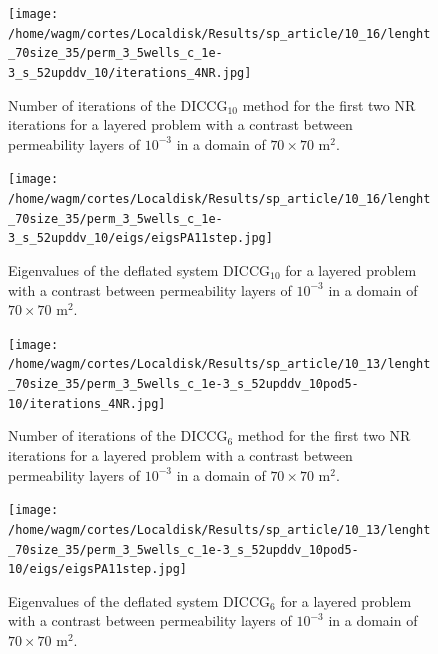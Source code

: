 \documentclass[12pt]{article}
\begin{document}
\begin{figure}[!h]
\centering
\begin{minipage}{.4\textwidth}
\vspace{-0.4cm}
\hspace{-1cm}
\texttt{[image: /home/wagm/cortes/Localdisk/Results/sp\_article/10\_16/lenght\_70size\_35/perm\_3\_5wells\_c\_1e-3\_s\_52upddv\_10/iterations\_4NR.jpg]}
\vspace{-1.3cm}
\caption{Number of iterations of the DICCG$_{10}$ method for the first two NR iterations for a layered problem with a contrast between permeability layers of $10^{-3}$ in a domain of $70 \times 70$ m$^2$.}
\label{fig:NR_D10_3}
\end{minipage}%
\hspace{15mm}
\begin{minipage}{.4\textwidth}
 \centering
\texttt{[image: /home/wagm/cortes/Localdisk/Results/sp\_article/10\_16/lenght\_70size\_35/perm\_3\_5wells\_c\_1e-3\_s\_52upddv\_10/eigs/eigsPA11step.jpg]}
\caption{Eigenvalues of the deflated system DICCG$_{10}$ for a layered problem with a contrast between permeability layers of $10^{-3}$ in a domain of $70 \times 70$ m$^2$.}
\label{fig:eigs_PA10_3}
\end{minipage}
\end{figure}



\begin{figure}[!h]
\centering
\begin{minipage}{.4\textwidth}
\vspace{-0.4cm}
\hspace{-1cm}
\texttt{[image: /home/wagm/cortes/Localdisk/Results/sp\_article/10\_13/lenght\_70size\_35/perm\_3\_5wells\_c\_1e-3\_s\_52upddv\_10pod5-10/iterations\_4NR.jpg]}
\vspace{-1.3cm}
\caption{Number of iterations of the DICCG$_6$ method for the first two NR iterations for a layered problem with a contrast between permeability layers of $10^{-3}$ in a domain of $70 \times 70$ m$^2$.}
\label{fig:NR_D6_3}
\end{minipage}%
\hspace{15mm}
\begin{minipage}{.4\textwidth}
 \centering
\texttt{[image: /home/wagm/cortes/Localdisk/Results/sp\_article/10\_13/lenght\_70size\_35/perm\_3\_5wells\_c\_1e-3\_s\_52upddv\_10pod5-10/eigs/eigsPA11step.jpg]}
\caption{Eigenvalues of the deflated system DICCG$_6$ for a layered problem with a contrast between permeability layers of $10^{-3}$ in a domain of $70 \times 70$ m$^2$.}
\label{fig:eigs_PA6_3}
\end{minipage}
\end{figure}
\end{document}
